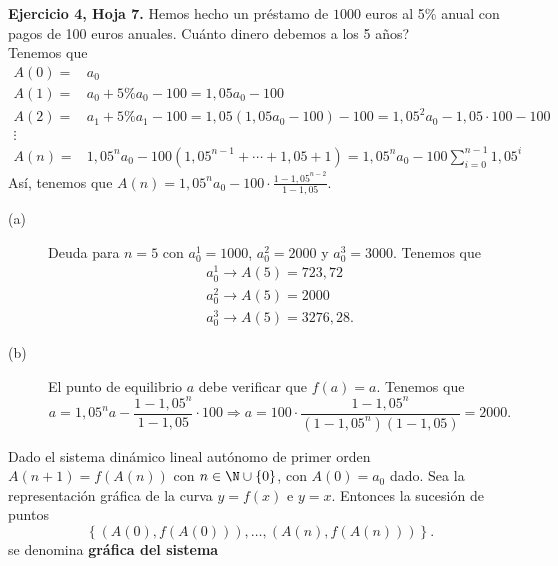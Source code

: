 \begin{eg}
\normalfont \textbf{Ejercicio 4, Hoja 7.} Hemos hecho un préstamo de $\displaystyle 1000 $ euros al 5\% anual con pagos de 100 euros anuales. Cuánto dinero debemos a los 5 años? \\ 
Tenemos que 
\[
\begin{split}
	A\left(0\right) = & a_{0} \\
	A\left(1\right) = & a_{0} + 5\% a_{0} -100 = 1,05a_{0} - 100 \\
	A\left(2\right) = & a_{1} + 5\% a_{1} -100 = 1,05\left(1,05a_{0}-100\right)-100 = 1,05^{2}a_{0}-1,05 \cdot 100 - 100 \\
	\vdots \\
	A\left(n\right) =& 1,05^{n}a_{0} - 100\left(1,05^{n-1} + \cdots + 1,05 + 1\right) = 1,05^{n}a_{0}-100\sum^{n-1}_{i=0}1,05^{i}
\end{split}
\]
Así, tenemos que $\displaystyle A\left(n\right) = 1,05^{n}a_{0} -100 \cdot \frac{1 - 1,05^{n-2}}{1 - 1,05} $.
\begin{description}
\item[(a)] Deuda para $\displaystyle n = 5 $ con $\displaystyle a_{0}^{1}= 1000 $, $\displaystyle a_{0}^{2} = 2000 $ y $\displaystyle a_{0}^{3} = 3000 $. Tenemos que
	\[
	\begin{split}
	a_{0}^{1} \to A\left(5\right) = 723,72 \\
	a_{0}^{2} \to A\left(5\right) = 2000 \\
	a_{0}^{3} \to A\left(5\right) = 3276,28.
	\end{split}
	\]
\item[(b)] El punto de equilibrio $\displaystyle a $ debe verificar que $\displaystyle f\left(a\right) = a $. Tenemos que 
\[ a = 1,05^{n}a - \frac{1-1,05^{n}}{1 - 1,05} \cdot 100 \Rightarrow a = 100 \cdot \frac{1 - 1,05^{n}}{\left(1-1,05^{n}\right)\left(1-1,05\right)} = 2000 .\]
\end{description}
\end{eg}
\begin{fdefinition}
	\normalfont Dado el sistema dinámico lineal autónomo de primer orden $\displaystyle A\left(n+1\right) = f\left(A\left(n\right)\right) $ con $\displaystyle n \in \N \cup \left\{ 0\right\}  $, con $\displaystyle A\left(0\right) = a_{0} $ dado. Sea la representación gráfica de la curva $\displaystyle y = f\left(x\right) $ e $\displaystyle y = x $. Entonces la sucesión de puntos  
\[ \left\{ \left(A\left(0\right), f\left(A\left(0\right)\right)\right), \ldots, \left(A\left(n\right), f\left(A\left(n\right)\right)\right)\right\}.\]
se denomina \textbf{gráfica del sistema} 
\end{fdefinition}
